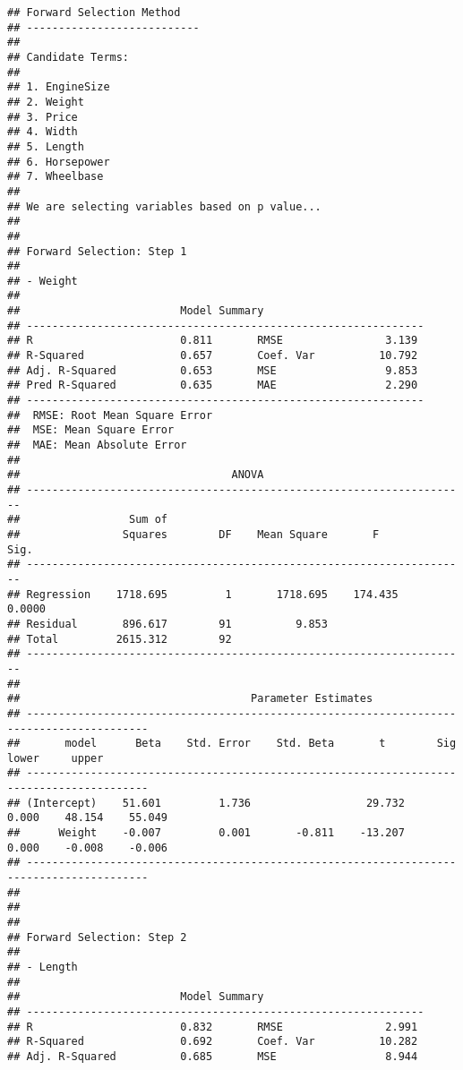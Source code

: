 \documentclass[
]{book}
\begin{document}
\begin{verbatim}
## Forward Selection Method    
## ---------------------------
## 
## Candidate Terms: 
## 
## 1. EngineSize 
## 2. Weight 
## 3. Price 
## 4. Width 
## 5. Length 
## 6. Horsepower 
## 7. Wheelbase 
## 
## We are selecting variables based on p value...
## 
## 
## Forward Selection: Step 1 
## 
## - Weight 
## 
##                         Model Summary                          
## --------------------------------------------------------------
## R                       0.811       RMSE                3.139 
## R-Squared               0.657       Coef. Var          10.792 
## Adj. R-Squared          0.653       MSE                 9.853 
## Pred R-Squared          0.635       MAE                 2.290 
## --------------------------------------------------------------
##  RMSE: Root Mean Square Error 
##  MSE: Mean Square Error 
##  MAE: Mean Absolute Error 
## 
##                                 ANOVA                                 
## ---------------------------------------------------------------------
##                 Sum of                                               
##                Squares        DF    Mean Square       F         Sig. 
## ---------------------------------------------------------------------
## Regression    1718.695         1       1718.695    174.435    0.0000 
## Residual       896.617        91          9.853                      
## Total         2615.312        92                                     
## ---------------------------------------------------------------------
## 
##                                    Parameter Estimates                                    
## -----------------------------------------------------------------------------------------
##       model      Beta    Std. Error    Std. Beta       t        Sig      lower     upper 
## -----------------------------------------------------------------------------------------
## (Intercept)    51.601         1.736                  29.732    0.000    48.154    55.049 
##      Weight    -0.007         0.001       -0.811    -13.207    0.000    -0.008    -0.006 
## -----------------------------------------------------------------------------------------
## 
## 
## 
## Forward Selection: Step 2 
## 
## - Length 
## 
##                         Model Summary                          
## --------------------------------------------------------------
## R                       0.832       RMSE                2.991 
## R-Squared               0.692       Coef. Var          10.282 
## Adj. R-Squared          0.685       MSE                 8.944 

\end{verbatim}
\end{document}
